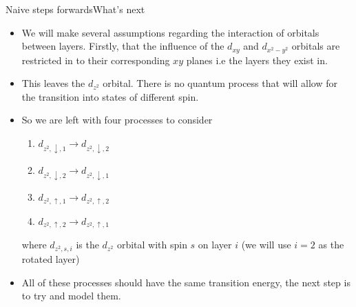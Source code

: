 \documentclass[9pt]{beamer}
\begin{document}
\begin{frame}{Naive steps forwards}{What's next}
  \begin{itemize}
    \item We will make several assumptions regarding the interaction of orbitals between layers. Firstly, that the influence of the $d_{xy}$ and $d_{x^2-y^2}$ orbitals are restricted in to their corresponding $xy$ planes i.e the layers they exist in.

    \item This leaves the $d_{z^2}$ orbital. There is no quantum process that will allow for the transition into states of different spin.

    \item{So we are left with four processes to consider

      \begin{enumerate}
        \item $d_{z^2, \downarrow, 1} \rightarrow d_{z^2, \downarrow, 2}$
        \item $d_{z^2, \downarrow, 2} \rightarrow d_{z^2, \downarrow, 1}$
        \item $d_{z^2, \uparrow, 1} \rightarrow d_{z^2, \uparrow, 2}$
        \item $d_{z^2, \uparrow, 2} \rightarrow d_{z^2, \uparrow, 1}$
      \end{enumerate}

      where $d_{z^2, s, i}$ is the $d_{z^2}$ orbital with spin $s$ on layer $i$ (we will use $i=2$ as the rotated layer)
      }

    \item All of these processes should have the same transition energy, the next step is to try and model them.
  \end{itemize}
\end{frame}
\end{document}
